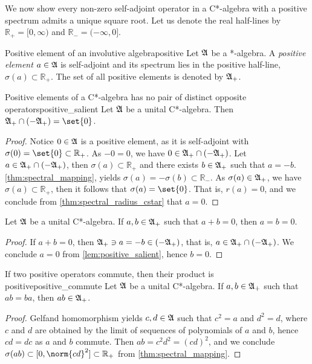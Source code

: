 We now show every non-zero self-adjoint operator in a C*-algebra with a positive spectrum admits a unique square root. Let us denote the real half-lines by \(\mathbb{R}_+ = [0,\infty)\) and \(\mathbb{R}_- = (-\infty, 0]\).
\begin{definition}{Positive element of an involutive algebra}{positive}
    Let \(\mathfrak{A}\) be a *-algebra. A \emph{positive element} \(a \in \mathfrak{A}\) is self-adjoint and its spectrum lies in the positive half-line, \(\sigma(a) \subset \mathbb{R}_+\). The set of all positive elements is denoted by \(\mathfrak{A}_+\).
\end{definition}

\begin{lemma}{Positive elements of a C*-algebra has no pair of distinct opposite operators}{positive_salient}
    Let \(\mathfrak{A}\) be a unital C*-algebra. Then \(\algebra{A}_+ \cap (-\algebra{A}_+) = \set{0}\).
\end{lemma}
\begin{proof}
    Notice \(0 \in \mathfrak{A}\) is a positive element, as it is self-adjoint with \(\sigma(0) = \set{0} \subset \mathbb{R}_+\). As \(-0 = 0\), we have \(0 \in \mathfrak{A}_+ \cap (-\mathfrak{A}_+)\). Let \(a \in \mathfrak{A}_+ \cap (-\mathfrak{A}_+)\), then \(\sigma(a) \subset \mathbb{R}_+\) and there exists \(b \in \mathfrak{A}_+\) such that \(a = -b\). \cref{thm:spectral_mapping}, yields \(\sigma(a) = -\sigma(b) \subset \mathbb{R}_-\). As \(\sigma(a)\in \mathfrak{A}_+\), we have \(\sigma(a) \subset \mathbb{R}_+\), then it follows that \(\sigma(a) = \set{0}\). That is, \(r(a) = 0\), and we conclude from \cref{thm:spectral_radius_cstar} that \(a = 0\).
\end{proof}
\begin{corollary}
    Let \(\mathfrak{A}\) be a unital C*-algebra. If \(a, b\in \mathfrak{A}_+\) such that \(a + b = 0\), then \(a = b = 0\).
\end{corollary}
\begin{proof}
    If \(a + b = 0\), then \(\mathfrak{A}_+ \ni a = -b \in (-\mathfrak{A}_+)\), that is, \(a \in \mathfrak{A}_+ \cap (-\mathfrak{A}_+)\). We conclude \(a = 0\) from \cref{lem:positive_salient}, hence \(b = 0\).
\end{proof}

\begin{lemma}{If two positive operators commute, then their product is positive}{positive_commute}
    Let \(\mathfrak{A}\) be a unital C*-algebra. If \(a,b \in \mathfrak{A}_+\) such that \(ab = ba\), then \(ab \in \mathfrak{A}_+\).
\end{lemma}
\begin{proof}
    Gelfand homomorphism yields \(c,d \in \mathfrak{A}\) such that \(c^2 = a\) and \(d^2 = d\), where \(c\) and \(d\) are obtained by the limit of sequences of polynomials of \(a\) and \(b\), hence \(cd = dc\) as \(a\) and \(b\) commute. Then \(ab = c^2 d^2 = (cd)^2\), and we conclude \(\sigma(ab) \subset [0, \norm{cd}^2] \subset \mathbb{R}_+\) from \cref{thm:spectral_mapping}.
\end{proof}

